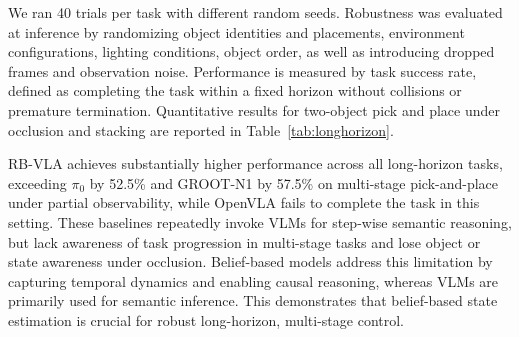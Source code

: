 \documentclass[conference]{IEEEtran}
\begin{document}
We ran 40 trials per task with different random seeds. Robustness was evaluated at inference by randomizing object identities and placements, environment configurations, lighting conditions, object order, as well as introducing dropped frames and observation noise. Performance is measured by task success rate, defined as completing the task within a fixed horizon without collisions or premature termination. Quantitative results for two-object pick and place under occlusion and stacking are reported in Table~\ref{tab:longhorizon}.
\begin{table}[h]
\centering
\caption{Long-horizon success rates (\%) for pick-and-place (P\&P) and stacking tasks.}
\label{tab:longhorizon}
\end{table}
RB-VLA achieves substantially higher performance across all long-horizon tasks, exceeding $\pi_0$ by 52.5\% and GROOT-N1 by 57.5\% on multi-stage pick-and-place under partial observability, while OpenVLA fails to complete the task in this setting. These baselines repeatedly invoke VLMs for step-wise semantic reasoning, but lack awareness of task progression in multi-stage tasks and lose object or state awareness under occlusion. Belief-based models address this limitation by capturing temporal dynamics and enabling causal reasoning, whereas VLMs are primarily used for semantic inference. This demonstrates that belief-based state estimation is crucial for robust long-horizon, multi-stage control.
\end{document}
